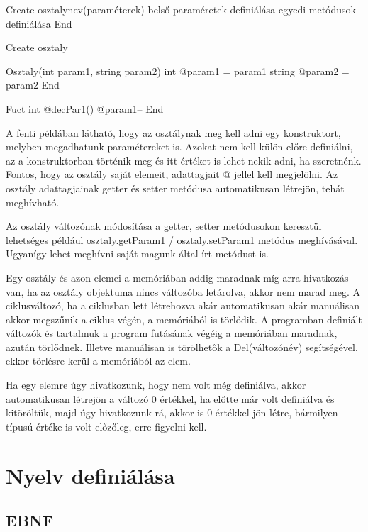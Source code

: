 \begin{cpp}
Create osztalynev(paraméterek)
	belső paraméretek definiálása
	egyedi metódusok definiálása
End
\end{cpp}

\begin{cpp}
Create osztaly
	
	Osztaly(int param1, string param2)
		int @param1 = param1
		string @param2 = param2
	End
		
	Fuct int @decPar1()
		@param1--
	End
\end{cpp}

A fenti példában látható, hogy az osztálynak meg kell adni egy konstruktort, melyben megadhatunk paramétereket is. Azokat nem kell külön előre definiálni, az a konstruktorban történik meg és itt értéket is lehet nekik adni, ha szeretnénk. Fontos, hogy az osztály saját elemeit, adattagjait @ jellel kell megjelölni. Az osztály adattagjainak getter és setter metódusa automatikusan létrejön, tehát meghívható.

Az osztály változónak módosítása a getter, setter metódusokon keresztül lehetséges például osztaly.getParam1 / osztaly.setParam1 metódus meghívásával. Ugyanígy lehet meghívni saját magunk által írt metódust is.

Egy osztály és azon elemei a memóriában addig maradnak míg arra hivatkozás van, ha az osztály objektuma nincs változóba letárolva, akkor nem marad meg. A ciklusváltozó, ha a ciklusban lett létrehozva akár automatikusan akár manuálisan akkor megszűnik a ciklus végén, a memóriából is törlődik. A programban definiált változók és tartalmuk a program futásának végéig a memóriában maradnak, azután törlődnek. Illetve manuálisan is törölhetők a Del(változónév) segítségével, ekkor törlésre kerül a memóriából az elem.

Ha egy elemre úgy hivatkozunk, hogy nem volt még definiálva, akkor automatikusan létrejön a változó 0 értékkel, ha előtte már volt definiálva és kitöröltük, majd úgy hivatkozunk rá, akkor is 0 értékkel jön létre, bármilyen típusú értéke is volt előzőleg, erre figyelni kell.

\section{Nyelv definiálása}

\subsection{EBNF}

